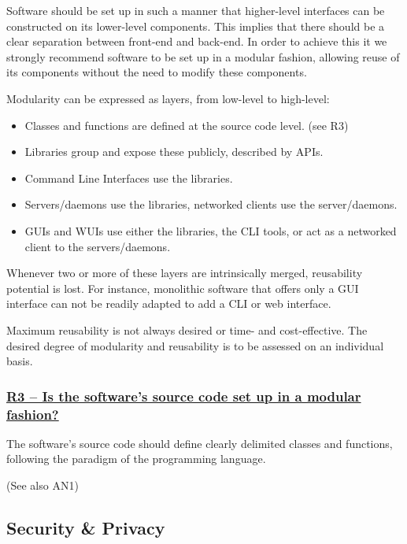 \documentclass[a4paper,11pt]{article}
\newcommand{\indicator}[1]{\subsubsection*{\underline{#1}}}
\begin{document}
Software should be set up in such a manner that higher-level interfaces can be
constructed on its lower-level components. This implies that there should be a
clear separation between front-end and back-end. In order to achieve this it we
strongly recommend software to be set up in a modular fashion, allowing reuse
of its components without the need to modify these components.

Modularity can be expressed as layers, from low-level to high-level:

\begin{itemize}
 \item Classes and functions are defined at the source code level. (see R3)
 \item Libraries group and expose these publicly, described by APIs. 
 \item Command Line Interfaces use the libraries.
 \item Servers/daemons use the libraries, networked clients use the server/daemons.
 \item GUIs and WUIs use either the libraries, the CLI tools, or act as a networked client to the servers/daemons.
\end{itemize}

Whenever two or more of these layers are intrinsically merged, reusability potential is lost.
For instance, monolithic software that offers only a GUI interface can not be
readily adapted to add a CLI or web interface.

Maximum reusability is not always desired or time- and cost-effective. The
desired degree of modularity and reusability is to be assessed on an
individual basis.

\indicator{R3 -- Is the software's source code set up in a modular fashion?}
%
%
%

The software's source code should define clearly delimited classes and
functions, following the paradigm of the programming language. 

(See also AN1)

\subsection{Security \& Privacy}
\end{document}
